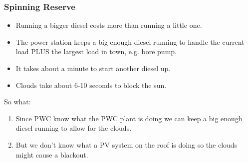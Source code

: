 \documentclass{beamer}
\begin{document}
\begin{frame}\frametitle{Spinning Reserve}
  \begin{itemize}
  \item Running a bigger diesel costs more than running a little one.
  \item The power station keeps a big enough diesel running to handle
    the current load PLUS the largest load in town, e.g. bore pump. 
  \item It takes about a minute to start another diesel up.
  \item Clouds take about 6-10 seconds to block the sun.
  \end{itemize}

  So what:
  \begin{enumerate}
  \item Since PWC know what the PWC plant is doing we can keep a big enough
  diesel running to allow for the clouds.
  \item But we don't know what a PV system on the roof is doing
  so the clouds might cause a blackout.
  \end{enumerate}
\end{frame}
\end{document}
